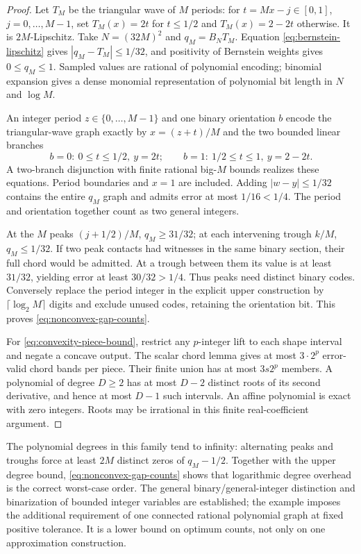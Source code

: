 \begin{proof}
Let $T_M$ be the triangular wave of $M$ periods: for
$t=Mx-j\in[0,1]$, $j=0,\ldots,M-1$, set
$T_M(x)=2t$ for $t\le1/2$ and $T_M(x)=2-2t$ otherwise.
It is $2M$-Lipschitz. Take $N=(32M)^2$ and $q_M=B_NT_M$.
Equation \eqref{eq:bernstein-lipschitz} gives
$|q_M-T_M|\le1/32$, and positivity of Bernstein weights gives
$0\le q_M\le1$. Sampled values are rational of polynomial encoding;
binomial expansion gives a dense monomial representation of polynomial
bit length in $N$ and $\log M$.

An integer period $z\in\{0,\ldots,M-1\}$ and one binary orientation
$b$ encode the triangular-wave graph exactly by $x=(z+t)/M$ and the
two bounded linear branches
\[
 b=0:\ 0\le t\le1/2,\ y=2t;
 \qquad b=1:\ 1/2\le t\le1,\ y=2-2t.
\]
A two-branch disjunction with finite rational big-$M$ bounds realizes
these equations. Period boundaries and $x=1$ are included. Adding
$|w-y|\le1/32$ contains the entire $q_M$ graph and admits error
at most $1/16<1/4$. The period and orientation together count as two
general integers.

At the $M$ peaks $(j+1/2)/M$, $q_M\ge31/32$; at each intervening
trough $k/M$, $q_M\le1/32$. If two peak contacts had witnesses in
the same binary section, their full chord would be admitted. At a
trough between them its value is at least $31/32$, yielding error
at least $30/32>1/4$. Thus peaks need distinct binary codes.
Conversely replace the period integer in the explicit upper construction
by $\lceil\log_2M\rceil$ digits and exclude unused codes, retaining
the orientation bit. This proves \eqref{eq:nonconvex-gap-counts}.

For \eqref{eq:convexity-piece-bound}, restrict any $p$-integer lift
to each shape interval and negate a concave output. The scalar chord
lemma gives at most $3\cdot2^p$ error-valid chord bands per piece.
Their finite union has at most $3s2^p$ members. A polynomial of
degree $D\ge2$ has at most $D-2$ distinct roots of its second
derivative, and hence at most $D-1$ such intervals. An affine
polynomial is exact with zero integers. Roots may be irrational in this
finite real-coefficient argument.
\end{proof}

The polynomial degrees in this family tend to infinity: alternating
peaks and troughs force at least $2M$ distinct zeros of $q_M-1/2$.
Together with the upper degree bound, \eqref{eq:nonconvex-gap-counts}
shows that logarithmic degree overhead is the correct worst-case order.
The general binary/general-integer distinction and binarization of
bounded integer variables are established; the example imposes the
additional requirement of one connected rational polynomial graph at
fixed positive tolerance. It is a lower bound on optimum counts, not
only on one approximation construction.

